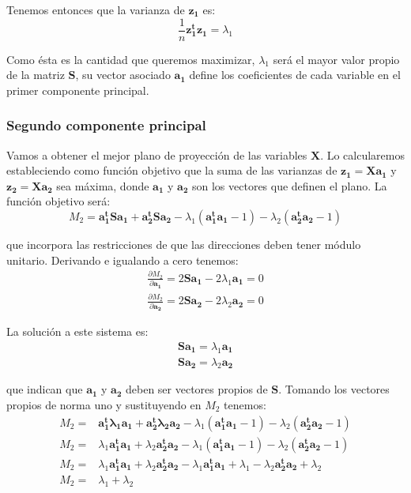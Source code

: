 \documentclass[12pt,letterpaper]{report} %
\begin{document}
Tenemos entonces que la varianza de $\mathbf{z_1}$ es: 
$$\frac{1}{n} \mathbf{z_1^tz_1}=\lambda_1$$

Como ésta es la cantidad que queremos maximizar, $\lambda_1$ será el mayor valor propio de la matriz $\mathbf{S}$, su vector asociado $\mathbf{a_1}$ define los coeficientes de cada variable en el primer componente principal.

\subsubsection{Segundo componente principal}

Vamos a obtener el mejor plano de proyección de las variables $\mathbf{X}$. Lo calcularemos estableciendo como función objetivo que la suma de las varianzas de $\mathbf{z_1}=\mathbf{Xa_1}$ y $\mathbf{z_2}=\mathbf{Xa_2}$ sea máxima, donde $\mathbf{a_1}$ y $\mathbf{a_2}$ son los vectores que definen el plano. La función objetivo será:
$$M_2=\mathbf{a_1^tS a_1}+\mathbf{a_2^tS a_2}-\lambda_1(\mathbf{a_1^ta_1}-1)-\lambda_2(\mathbf{a_2^ta_2}-1)$$

que incorpora las restricciones de que las direcciones deben tener módulo unitario. Derivando e igualando a cero tenemos:
$$
\begin{array}{rl}
\frac{\partial M_2}{\partial \mathbf{a_1}}= 2\mathbf{Sa_1}-2\lambda_1\mathbf{a_1}=0\\
\frac{\partial M_2}{\partial \mathbf{a_2}}= 2\mathbf{Sa_2}-2\lambda_2\mathbf{a_2}=0
\end{array}
$$

La solución a este sistema es:
$$
\begin{array}{rl}
\mathbf{Sa_1}=\lambda_1\mathbf{a_1}\\
\mathbf{Sa_2}=\lambda_2\mathbf{a_2}
\end{array}
$$

que indican que $\mathbf{a_1}$ y $\mathbf{a_2}$ deben ser vectores propios de $\mathbf{S}$. Tomando los vectores propios de norma uno y sustituyendo en $M_2$ tenemos:
$$
\begin{array}{rl}
M_2=&\mathbf{a_1^t\lambda_1\mathbf{a_1}}+\mathbf{a_2^t\lambda_2\mathbf{a_2}}-\lambda_1(\mathbf{a_1^ta_1}-1)-\lambda_2(\mathbf{a_2^ta_2}-1)\\
M_2=&\lambda_1\mathbf{a_1^t a_1}+\lambda_2\mathbf{a_2^ta_2}-\lambda_1(\mathbf{a_1^ta_1}-1)-\lambda_2(\mathbf{a_2^ta_2}-1)\\
M_2=&\lambda_1\mathbf{a_1^t a_1}+\lambda_2\mathbf{a_2^ta_2}-\lambda_1\mathbf{a_1^ta_1}+\lambda_1-\lambda_2\mathbf{a_2^ta_2}+\lambda_2\\
M_2 =& \lambda_1+\lambda_2
\end{array}
$$
\end{document}
